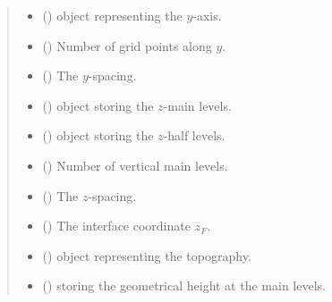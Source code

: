 \documentclass[letterpaper,10pt,english]{sphinxmanual}
\begin{document}
\begin{fulllineitems}
\begin{quote}
\begin{description}
\begin{itemize}
\item {} 
{\hyperref[\detokenize{api:grids.xyz_grid.XYZGrid.y}]{}} () \textendash{} {\hyperref[\detokenize{api:grids.axis.Axis}]{}} object representing the \(y\)-axis.

\item {} 
{\hyperref[\detokenize{api:grids.xyz_grid.XYZGrid.ny}]{}} () \textendash{} Number of grid points along \(y\).

\item {} 
{\hyperref[\detokenize{api:grids.xyz_grid.XYZGrid.dy}]{}} () \textendash{} The \(y\)-spacing.

\item {} 
 () \textendash{} {\hyperref[\detokenize{api:grids.axis.Axis}]{}} object storing the \(z\)-main levels.

\item {} 
 () \textendash{} {\hyperref[\detokenize{api:grids.axis.Axis}]{}} object storing the \(z\)-half levels.

\item {} 
 () \textendash{} Number of vertical main levels.

\item {} 
 () \textendash{} The \(z\)-spacing.

\item {} 
 () \textendash{} The interface coordinate \(z_F\).

\item {} 
{\hyperref[\detokenize{api:module-grids.topography}]{}} () \textendash{} {\hyperref[\detokenize{api:grids.topography.Topography2d}]{}} object representing
the topography.

\item {} 
 () \textendash{}  storing the geometrical height at
the main levels.


\end{itemize}
\end{description}
\end{quote}
\end{fulllineitems}
\end{document}
